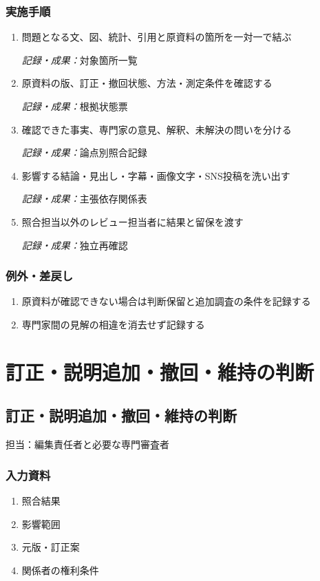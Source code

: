 \documentclass[a4paper,11pt]{article}
\begin{document}
\subsubsection*{実施手順}
\begin{enumerate}[leftmargin=2em,itemsep=0.65em]
\item 問題となる文、図、統計、引用と原資料の箇所を一対一で結ぶ\par\noindent\textit{記録・成果：}対象箇所一覧\nobreak\smallskip
\item 原資料の版、訂正・撤回状態、方法・測定条件を確認する\par\noindent\textit{記録・成果：}根拠状態票\nobreak\smallskip
\item 確認できた事実、専門家の意見、解釈、未解決の問いを分ける\par\noindent\textit{記録・成果：}論点別照合記録\nobreak\smallskip
\item 影響する結論・見出し・字幕・画像文字・SNS投稿を洗い出す\par\noindent\textit{記録・成果：}主張依存関係表\nobreak\smallskip
\item 照合担当以外のレビュー担当者に結果と留保を渡す\par\noindent\textit{記録・成果：}独立再確認\nobreak\smallskip
\end{enumerate}
\subsubsection*{例外・差戻し}
\begin{enumerate}[leftmargin=2em,itemsep=0.35em]
\item 原資料が確認できない場合は判断保留と追加調査の条件を記録する
\item 専門家間の見解の相違を消去せず記録する
\end{enumerate}
\section{訂正・説明追加・撤回・維持の判断}
\subsection{訂正・説明追加・撤回・維持の判断}
\par 担当：編集責任者と必要な専門審査者\par\medskip
\subsubsection*{入力資料}
\begin{enumerate}[leftmargin=2em,itemsep=0.35em]
\item 照合結果
\item 影響範囲
\item 元版・訂正案
\item 関係者の権利条件
\end{enumerate}
\end{document}
